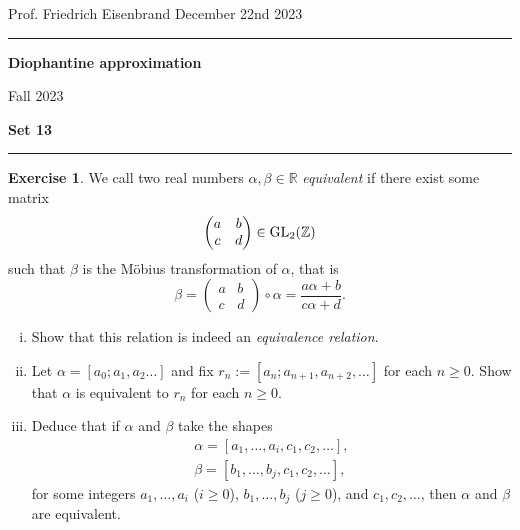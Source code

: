 \documentclass[12pt,a4paper]{article}
\date{}
\theoremstyle{plain}
\newtheorem*{Sol*}{Solution}
\theoremstyle{definition}
\newtheorem{Ex}{Exercise}
\def \R {\mathbb R}
\def \Z {\mathbb Z}
\newif\ifsolutions
\newcommand{\exercise}[2]{
			\begin{Ex} #1 \end{Ex}
			\ifsolutions  \begin{Sol*} #2 \end{Sol*} \bigskip \else \bigskip  \fi
		}
\begin{document}
\begin{center}
{Prof. Friedrich Eisenbrand \hfill December 22nd 2023}
\end{center}
	
\hrule\vspace{\baselineskip}

\begin{center}
\textbf{Diophantine approximation}

Fall 2023

\bigskip

\textbf{Set 13}
\ifsolutions{\textbf{- Solutions}} \else{} \fi
\end{center}

\hrule\vspace{\baselineskip}




\exercise{\label{ex:1}
	We call two real numbers $\alpha, \beta \in \R$ \emph{equivalent} if there exist some matrix
		\[ \begin{pmatrix} a & b \\ c & d \end{pmatrix} \in {\rm GL}_2(\Z) \]
	such that $\beta$ is the Möbius transformation of $\alpha$, that is
		\[ \beta = \begin{pmatrix} a & b \\ c & d \end{pmatrix} \circ α =    \frac{a \alpha + b}{c \alpha + d}. \]
	
	\begin{enumerate}[i)]
		\item Show that this relation is indeed an \emph{equivalence relation}.
		\item Let $\alpha = [a_0;a_1, a_2 \dots]$ and fix $r_n := [a_n; a_{n+1}, a_{n+2}, \dots]$ for each $n \geq 0$.
		Show that $\alpha$ is equivalent to $r_n$ for each $n \geq 0$.

		\item Deduce that if $\alpha$ and $\beta$ take the shapes
			\begin{gather*}
				\alpha = [a_1, \dots, a_i, c_1, c_2, \dots], \\
				\beta = [b_1, \dots, b_j, c_1, c_2, \dots],
			\end{gather*}
		for some integers $a_1, \dots, a_i$ ($i \geq 0$), $b_1, \dots, b_j$ ($j\geq0$), and $c_1, c_2, \dots$,
		then $\alpha$ and $\beta$ are equivalent.
	\end{enumerate}
}
{}
\end{document}

